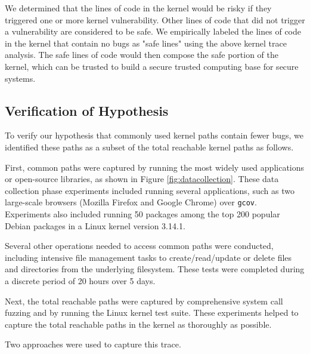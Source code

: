 We determined that the lines of code in the kernel would be risky
if they triggered one or more kernel vulnerability. Other lines of code
that did not trigger a vulnerability are considered to be safe. We empirically
 labeled the lines of code in the kernel that contain no bugs as "safe lines"
using the above kernel trace analysis.
The safe lines of code would then compose the safe portion of the kernel, which can be trusted to build a secure trusted computing base for secure systems.

\subsection{Verification of Hypothesis}
\label{Verification-of-Hypothesis}

To verify our hypothesis that commonly used kernel paths contain fewer bugs,
we identified these paths as a subset of the total reachable kernel paths as follows.

First, common paths were captured by running the most widely used applications
or open-source libraries, as shown in Figure \ref{fig:datacollection}.
These data collection phase experiments included running several applications,
such as two large-scale browsers (Mozilla Firefox and Google Chrome)
 over \texttt{gcov}. Experiments also included running 50 packages among
 the top 200 popular Debian packages \cite{Top-Packages}
 in a Linux kernel version 3.14.1.

Several other operations needed to access common paths were conducted, including
intensive file management tasks to create/read/update or delete files and
directories from the underlying filesystem. These tests were completed
during a discrete period of 20 hours over 5 days.

Next, the total reachable paths were captured by comprehensive system call
fuzzing and by running the Linux kernel test suite. These experiments helped
 to capture the total reachable paths in the kernel as thoroughly as possible.

Two approaches were used to capture this trace.

